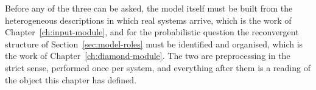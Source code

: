 \documentclass[12pt]{report}
\begin{document}
Before any of the three can be asked, the model itself must be built from
the heterogeneous descriptions in which real systems arrive, which is the
work of Chapter~\ref{ch:input-module}, and for the probabilistic question
the reconvergent structure of Section~\ref{sec:model-roles} must be
identified and organised, which is the work of
Chapter~\ref{ch:diamond-module}. The two are preprocessing in the strict
sense, performed once per system, and everything after them is a reading
of the object this chapter has defined.

\ifdefined\maindoc
\else
\printbibliography
\end{document}
